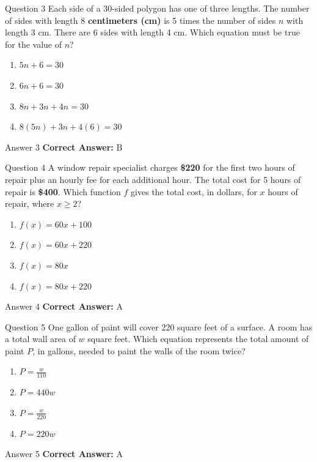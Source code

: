 \documentclass{beamer}
\begin{document}
\begin{frame}{Question 3}
\small
Each side of a 30-sided polygon has one of three lengths. The number of sides with length 8 \textbf{centimeters (cm)} is 5 times the number of sides \( n \) with length 3 cm. There are 6 sides with length 4 cm. Which equation must be true for the value of \( n \)?
\vspace{0.35cm}
\begin{enumerate}
    \item[A.] $5n + 6 = 30$
    \item[B.] $6n + 6 = 30$
    \item[C.] $8n + 3n + 4n = 30$
    \item[D.] $8(5n) + 3n + 4(6) = 30$
\end{enumerate}
\end{frame}
\begin{frame}{Answer 3}
\small
\textbf{Correct Answer:} B
\end{frame}

\begin{frame}{Question 4}
\small
A window repair specialist charges \textbf{\$220} for the first two hours of repair plus an hourly fee for each additional hour. The total cost for 5 hours of repair is \textbf{\$400}. Which function \( f \) gives the total cost, in dollars, for \( x \) hours of repair, where \( x \geq 2 \)?
\vspace{0.35cm}
\begin{enumerate}
    \item[A.] $f(x) = 60x + 100$
    \item[B.] $f(x) = 60x + 220$
    \item[C.] $f(x) = 80x$
    \item[D.] $f(x) = 80x + 220$
\end{enumerate}
\end{frame}
\begin{frame}{Answer 4}
\small
\textbf{Correct Answer:} A
\end{frame}

\begin{frame}{Question 5}
\small
One gallon of paint will cover 220 square feet of a surface. A room has a total wall area of \( w \) square feet. Which equation represents the total amount of paint \( P \), in gallons, needed to paint the walls of the room twice?
\vspace{0.35cm}
\begin{enumerate}
    \item[A.] $P = \frac{w}{110}$
    \item[B.] $P = 440w$
    \item[C.] $P = \frac{w}{220}$
    \item[D.] $P = 220w$
\end{enumerate}
\end{frame}
\begin{frame}{Answer 5}
\small
\textbf{Correct Answer:} A
\end{frame}
\end{document}
